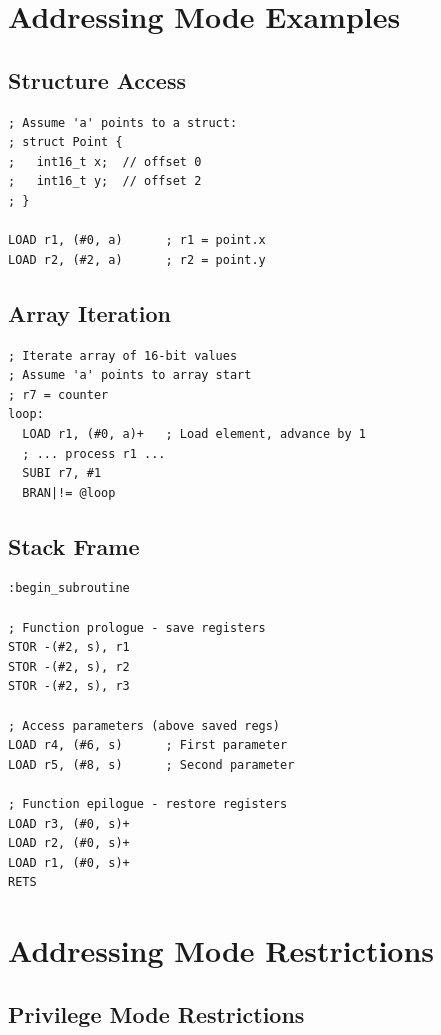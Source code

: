 \section{Addressing Mode Examples}

\subsection{Structure Access}

\begin{lstlisting}
; Assume 'a' points to a struct:
; struct Point {
;   int16_t x;  // offset 0
;   int16_t y;  // offset 2
; }

LOAD r1, (#0, a)      ; r1 = point.x
LOAD r2, (#2, a)      ; r2 = point.y
\end{lstlisting}

\subsection{Array Iteration}

\begin{lstlisting}
; Iterate array of 16-bit values
; Assume 'a' points to array start
; r7 = counter
loop:
  LOAD r1, (#0, a)+   ; Load element, advance by 1
  ; ... process r1 ...
  SUBI r7, #1
  BRAN|!= @loop
\end{lstlisting}

\subsection{Stack Frame}

\begin{lstlisting}
:begin_subroutine

; Function prologue - save registers
STOR -(#2, s), r1
STOR -(#2, s), r2
STOR -(#2, s), r3

; Access parameters (above saved regs)
LOAD r4, (#6, s)      ; First parameter
LOAD r5, (#8, s)      ; Second parameter

; Function epilogue - restore registers
LOAD r3, (#0, s)+
LOAD r2, (#0, s)+
LOAD r1, (#0, s)+
RETS
\end{lstlisting}

\section{Addressing Mode Restrictions}

\subsection{Privilege Mode Restrictions}

